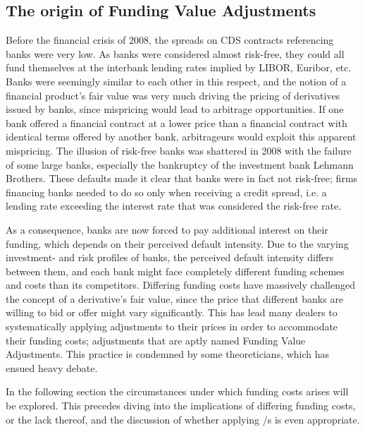 \documentclass[../../../main.tex]{subfiles}
\begin{document}
    \subsection{The origin of Funding Value Adjustments}
        Before the financial crisis of 2008, the spreads on CDS contracts referencing banks were very low. 
        As banks were considered almost risk-free, 
        they could all fund themselves at the interbank lending rates implied by LIBOR, Euribor, etc.
        Banks were seemingly similar to each other in this respect, 
        and the notion of a financial product's fair value was very much driving the pricing of derivatives issued by banks,
        since mispricing would lead to arbitrage opportunities.
        If one bank offered a financial contract at a lower price than a financial contract with identical terms
        offered by another bank, arbitrageurs would exploit this apparent mispricing. 
        The illusion of risk-free banks was shattered in 2008 with the failure of some large banks, 
        especially the bankruptcy of the investment bank Lehmann Brothers.
        These defaults made it clear that banks were in fact not risk-free; 
        firms financing banks needed to do so only when receiving a credit spread,
        i.e. a lending rate exceeding the interest rate that was considered the risk-free rate. 
        
        As a consequence, banks are now forced to pay additional interest on their funding, 
        which depends on their perceived default intensity.
        Due to the varying investment- and risk profiles of banks, 
        the perceived default intensity differs between them, 
        and each bank might face completely different funding schemes and costs than its competitors.
        Differing funding costs have massively challenged the concept of a derivative's fair value,
        since the price that different banks are willing to bid or offer might vary significantly. 
        This has lead many dealers to systematically applying adjustments to their prices
        in order to accommodate their funding costs; 
        adjustments that are aptly named Funding Value Adjustments. 
        This practice is condemned by some theoreticians, 
        which has ensued heavy debate.
        
        In the following section the circumstances under which funding costs arises will be explored.
        This precedes diving into the implications of differing funding costs, or the lack thereof,
        and the discussion of whether applying \FVA/s is even appropriate.
\end{document}
